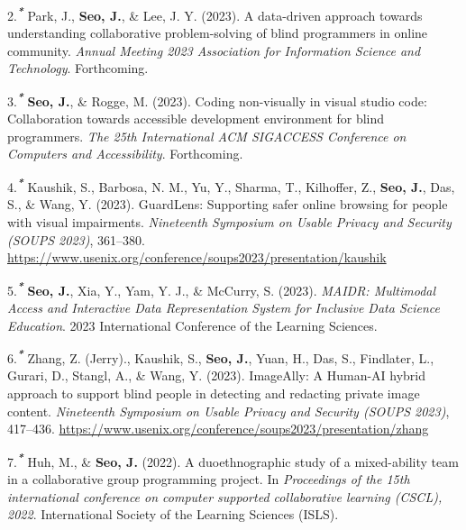 \documentclass[11pt,a4paper,]{awesome-cv}
\begin{document}
\leavevmode{}%
2.\textsuperscript{\textbf{\emph{*}}} Park, J., \textbf{Seo, J.}, \&
Lee, J. Y. (2023). A data-driven approach towards understanding
collaborative problem-solving of blind programmers in online community.
\emph{Annual Meeting 2023 Association for Information Science and
Technology}. Forthcoming.

\leavevmode{}%
3.\textsuperscript{\textbf{\emph{*}}} \textbf{Seo, J.}, \& Rogge, M.
(2023). Coding non-visually in visual studio code: Collaboration towards
accessible development environment for blind programmers. \emph{The 25th
International ACM SIGACCESS Conference on Computers and Accessibility}.
Forthcoming.

\leavevmode{}%
4.\textsuperscript{\textbf{\emph{*}}} Kaushik, S., Barbosa, N. M., Yu,
Y., Sharma, T., Kilhoffer, Z., \textbf{Seo, J.}, Das, S., \& Wang, Y.
(2023). GuardLens: Supporting safer online browsing for people with
visual impairments. \emph{Nineteenth Symposium on Usable Privacy and
Security (SOUPS 2023)}, 361--380.
\url{https://www.usenix.org/conference/soups2023/presentation/kaushik}

\leavevmode{}%
5.\textsuperscript{\textbf{\emph{*}}} \textbf{Seo, J.}, Xia, Y., Yam, Y.
J., \& McCurry, S. (2023). \emph{MAIDR: Multimodal Access and
Interactive Data Representation System for Inclusive Data Science
Education}. 2023 International Conference of the Learning Sciences.

\leavevmode{}%
6.\textsuperscript{\textbf{\emph{*}}} Zhang, Z. (Jerry)., Kaushik, S.,
\textbf{Seo, J.}, Yuan, H., Das, S., Findlater, L., Gurari, D., Stangl,
A., \& Wang, Y. (2023). ImageAlly: A Human-AI hybrid approach to support
blind people in detecting and redacting private image content.
\emph{Nineteenth Symposium on Usable Privacy and Security (SOUPS 2023)},
417--436.
\url{https://www.usenix.org/conference/soups2023/presentation/zhang}

\leavevmode{}%
7.\textsuperscript{\textbf{\emph{*}}} Huh, M., \& \textbf{Seo, J.}
(2022). A duoethnographic study of a mixed-ability team in a
collaborative group programming project. In \emph{Proceedings of the
15th international conference on computer supported collaborative
learning (CSCL), 2022}. International Society of the Learning Sciences
(ISLS).
\end{document}
